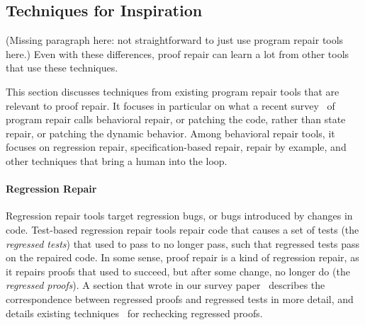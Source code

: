 \subsection{Techniques for Inspiration}
\label{sec:techniques}

(Missing paragraph here: not straightforward to just use program repair tools here.)
Even with these differences, proof repair can learn a lot from other tools that use these techniques.

This section discusses techniques from existing program repair tools that are relevant to proof repair.
It focuses in particular on what a recent survey~\cite{Monperrus:2018:ASR:3177787.3105906} of program repair calls behavioral repair,
or patching the code, rather than state repair, or patching the dynamic behavior.
Among behavioral repair tools, it focuses on regression repair, specification-based repair,
repair by example, and other techniques that bring a human into the loop.

\paragraph{Regression Repair}
Regression repair tools target regression bugs, or bugs introduced by changes in code.
Test-based regression repair tools repair code that causes a set of tests (the \textit{regressed tests}) that used to pass to no longer pass,
such that regressed tests pass on the repaired code.
In some sense, proof repair is a kind of regression repair, as it repairs
proofs that used to succeed, but after some change, no longer do (the \textit{regressed proofs}).
A section that  wrote in our survey paper~\cite{PGL-045} describes the correspondence between regressed proofs and regressed tests in more detail,
and details existing techniques~\cite{Palmskog2018, Wenzel2013MultiProcessing, Barras2013, Celik2017, Wenzel2013, Barras2015, deMoura2015, Wenzel2014, WenzelScalingIsabelle, WenzelFurtherScalingIsabelle} for rechecking regressed proofs.


